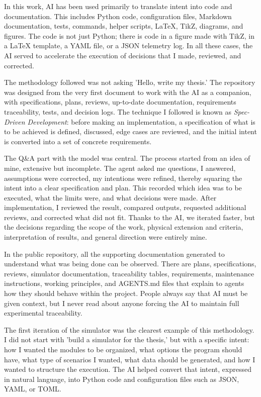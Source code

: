 In this work, AI has been used primarily to translate intent into code and documentation. This includes Python code, configuration files, Markdown documentation, tests, commands, helper scripts, LaTeX, TikZ, diagrams, and figures. The code is not just Python; there is code in a figure made with TikZ, in a LaTeX template, a YAML file, or a JSON telemetry log. In all these cases, the AI served to accelerate the execution of decisions that I made, reviewed, and corrected.

The methodology followed was not asking 'Hello, write my thesis.' The repository was designed from the very first document to work with the AI as a companion, with specifications, plans, reviews, up-to-date documentation, requirements traceability, tests, and decision logs. The technique I followed is known as \textit{Spec-Driven Development}: before making an implementation, a specification of what is to be achieved is defined, discussed, edge cases are reviewed, and the initial intent is converted into a set of concrete requirements.

The Q\&A part with the model was central. The process started from an idea of mine, extensive but incomplete. The agent asked me questions, I answered, assumptions were corrected, my intentions were refined, thereby squaring the intent into a clear specification and plan. This recorded which idea was to be executed, what the limits were, and what decisions were made. After implementation, I reviewed the result, compared outputs, requested additional reviews, and corrected what did not fit. Thanks to the AI, we iterated faster, but the decisions regarding the scope of the work, physical extension and criteria, interpretation of results, and general direction were entirely mine.

In the public repository, all the supporting documentation generated to understand what was being done can be observed. There are plans, specifications, reviews, simulator documentation, traceability tables, requirements, maintenance instructions, working principles, and AGENTS.md files that explain to agents how they should behave within the project. People always say that AI must be given context, but I never read about anyone forcing the AI to maintain full experimental traceability.

The first iteration of the simulator was the clearest example of this methodology. I did not start with 'build a simulator for the thesis,' but with a specific intent: how I wanted the modules to be organized, what options the program should have, what type of scenarios I wanted, what data should be generated, and how I wanted to structure the execution. The AI helped convert that intent, expressed in natural language, into Python code and configuration files such as JSON, YAML, or TOML.

